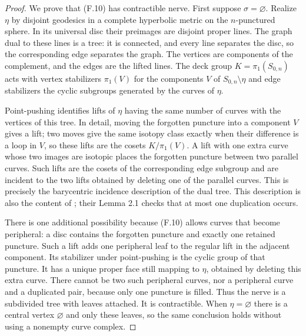 \begin{proof}
We prove that (F.10) has contractible nerve.  First suppose
$\sigma=\varnothing$.  Realize $\eta$ by disjoint geodesics in a
complete hyperbolic metric on the $n$-punctured sphere.  In its universal
disc their preimages are disjoint proper lines.  The graph dual to
these lines is a tree: it is connected, and every line separates the
disc, so the corresponding edge separates the graph.  The vertices
are components of the complement, and the edges are the lifted lines.
The deck group $K=\pi_1(S_{0,n})$ acts with vertex stabilizers
$\pi_1(V)$ for the components $V$ of $S_{0,n}\setminus\eta$ and edge
stabilizers the cyclic subgroups generated by the curves of $\eta$.

Point-pushing identifies lifts of $\eta$ having the same number of
curves with the vertices of this tree.  In detail, moving the forgotten
puncture into a component $V$ gives a lift; two moves give the same
isotopy class exactly when their difference is a loop in $V$, so these
lifts are the cosets $K/\pi_1(V)$.  A lift with one extra curve whose
two images are isotopic places the forgotten puncture between two
parallel curves.  Such lifts are the cosets of the corresponding edge
subgroup and are incident to the two lifts obtained by deleting one of
the parallel curves.  This is precisely the barycentric incidence
description of the dual tree.  This description is also the content
of \citet[Theorem 7.1]{FKentLeiningerSchleimer2009}; their Lemma 2.1
checks that at most one duplication occurs.

There is one additional possibility because (F.10) allows curves that
become peripheral: a disc contains the forgotten puncture and exactly
one retained puncture.  Such a lift adds one peripheral leaf to the
regular lift in the adjacent component.  Its stabilizer under
point-pushing is the cyclic group of that puncture.  It has a unique
proper face still mapping to $\eta$, obtained by deleting this extra
curve.  There cannot be two such peripheral curves, nor a peripheral
curve and a duplicated pair, because only one puncture is filled.
Thus the nerve is a subdivided tree with leaves attached.  It is
contractible.  When $\eta=\varnothing$ there is a central vertex
$\varnothing$ and only these leaves, so the same conclusion holds
without using a nonempty curve complex.


\end{proof}
